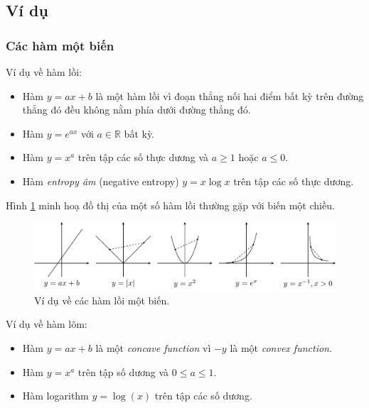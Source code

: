\subsection{Ví dụ}
 
\subsubsection{Các hàm một biến}
Ví dụ về hàm lồi:
\begin{itemize}
    \item Hàm $ y = ax + b$ là một {hàm lồi} vì đoạn thẳng nối hai điểm
    bất kỳ trên đường thẳng đó đều {không nằm phía dưới} đường thẳng đó. 
     
    \item Hàm $y = e^{ax}$ với $a \in \mathbb{R}$ bất kỳ. 
     
    \item Hàm $y = x^a$ trên tập các số thực dương và $a \geq 1$ hoặc $a \leq 0$. 
     
    \item Hàm \textit{entropy âm} (negative entropy) $y = x \log x$ trên tập các số thực dương. 

\end{itemize}
 
Hình \ref{fig:16_convexfunctions} minh hoạ đồ thị của một số hàm lồi thường
gặp với biến một chiều.

\begin{figure}[t]
\myrule
\vspace{3mm}
\centering
    \includegraphics[width = \textwidth]{Chapters/08_ConvexOptimization/16_convexity/latex/convexfunctions.pdf}
    \caption[]{Ví dụ về các hàm lồi một biến.}
    \label{fig:16_convexfunctions}
    \captionsetup[figure]{format=rule, justification=centering}
\end{figure}
 
Ví dụ về hàm lõm:
\begin{itemize}
    \item Hàm $y = ax + b$ là một \textit{concave function} vì $-y$ là một \textit{convex function}. 
     
    \item Hàm $y = x^a$ trên tập số dương và $0 \leq a \leq 1$. 
     
\item Hàm logarithm $y = \log(x)$ trên tập các số dương. 
\end{itemize}
 
